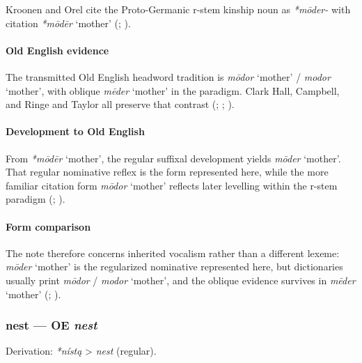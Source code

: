 \documentclass[
  british,
  a4paper,
]{article}
\providecommand{\Recon}[1]{\emph{*#1}}
\begin{document}
Kroonen and Orel cite the Proto-Germanic r-stem kinship noun as
\emph{*mōder-} with citation \Recon{mōdēr} `mother'
(; ).

\paragraph{Old English evidence}\label{old-english-evidence-50}

The transmitted Old English headword tradition is \emph{mōdor} `mother'
/ \emph{modor} `mother', with oblique \emph{mēder} `mother' in the
paradigm. Clark Hall, Campbell, and Ringe and Taylor all preserve that
contrast (;
;
).

\paragraph{Development to Old
English}\label{development-to-old-english-49}

From \Recon{mōdēr} `mother', the regular suffixal development yields
\emph{mōder} `mother'. That regular nominative reflex is the form
represented here, while the more familiar citation form \emph{mōdor}
`mother' reflects later levelling within the r-stem paradigm
(;
).

\paragraph{Form comparison}\label{form-comparison-2}

The note therefore concerns inherited vocalism rather than a different
lexeme: \emph{mōder} `mother' is the regularized nominative represented
here, but dictionaries usually print \emph{mōdor} / \emph{modor}
`mother', and the oblique evidence survives in \emph{mēder} `mother'
(;
).

\subsubsection{\texorpdfstring{nest --- OE
\emph{nest}}{nest --- OE nest}}\label{nest-oe-nest}

Derivation: \emph{*nístą} \textgreater{} \emph{nest} (regular).
\end{document}
